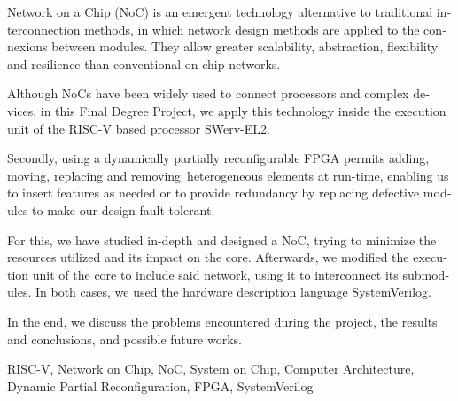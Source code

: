 \begin{otherlanguage}{english}

Network on a Chip (NoC) is an emergent technology alternative to traditional interconnection methods, in which network design methods are applied to the connexions between modules. They allow greater scalability, abstraction, flexibility and resilience than conventional on-chip networks.

Although NoCs have been widely used to connect processors and complex devices, in this Final Degree Project, we apply this technology inside the execution unit of the RISC-V based processor SWerv-EL2.

Secondly, using a dynamically partially reconfigurable FPGA permits adding, moving, replacing and removing heterogeneous elements at run-time, enabling us to insert features as needed or to provide redundancy by replacing defective modules to make our design fault-tolerant.

For this, we have studied in-depth and designed a NoC, trying to minimize the resources utilized and its impact on the core. Afterwards, we modified the execution unit of the core to include said network, using it to interconnect its submodules. In both cases, we used the hardware description language SystemVerilog.

In the end, we discuss the problems encountered during the project, the results and conclusions, and possible future works.

\vfill
\begin{keywords}[title=Keywords]
\small RISC-V, Network on Chip, NoC, System on Chip, Computer Architecture, Dynamic Partial Reconfiguration, FPGA, SystemVerilog
\end{keywords}
\end{otherlanguage}